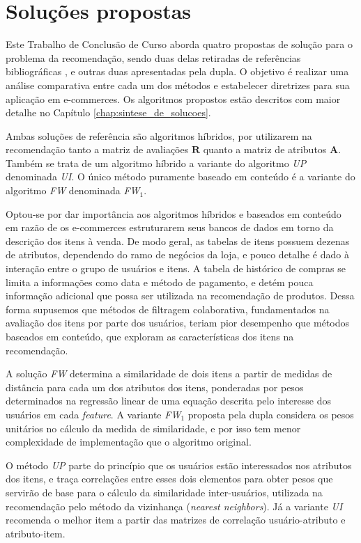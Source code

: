 
\section{Soluções propostas} %
\label{sec:solu_es_propostas}

Este Trabalho de Conclusão de Curso aborda quatro propostas de solução para o problema da recomendação, sendo duas delas retiradas de referências bibliográficas \cite{symeonidis2007feature,debnath2008feature}, e outras duas apresentadas pela dupla. O objetivo é realizar uma análise comparativa entre cada um dos métodos e estabelecer diretrizes para sua aplicação em e-commerces. Os algoritmos propostos estão descritos com maior detalhe no Capítulo \ref{chap:sintese_de_solucoes}.

Ambas soluções de referência são algoritmos híbridos, por utilizarem na recomendação tanto a matriz de avaliações $\mathbf{R}$ quanto a matriz de atributos $\mathbf{A}$. Também se trata de um algoritmo híbrido a variante do algoritmo \textit{UP} \cite{debnath2008feature} denominada \textit{UI}. O único método puramente baseado em conteúdo é a variante do algoritmo \textit{FW} \cite{symeonidis2007feature} denominada \textit{FW$_1$}. 

Optou-se por dar importância aos algoritmos híbridos e baseados em conteúdo em razão de os e-commerces estruturarem seus bancos de dados em torno da descrição dos itens à venda. De modo geral, as tabelas de itens possuem dezenas de atributos, dependendo do ramo de negócios da loja, e pouco detalhe é dado à interação entre o grupo de usuários e itens. A tabela de histórico de compras se limita a informações como data e método de pagamento, e detém pouca informação adicional que possa ser utilizada na recomendação de produtos. Dessa forma supusemos que métodos de filtragem colaborativa, fundamentados na avaliação dos itens por parte dos usuários, teriam pior desempenho que métodos baseados em conteúdo, que exploram as características dos itens na recomendação. 

A solução \textit{FW} determina a similaridade de dois itens a partir de medidas de distância para cada um dos atributos dos itens, ponderadas por pesos determinados na regressão linear de uma equação descrita pelo interesse dos usuários em cada \textit{feature}. A variante \textit{FW$_1$} proposta pela dupla considera os pesos unitários no cálculo da medida de similaridade, e por isso tem menor complexidade de implementação que o algoritmo original.

O método \textit{UP} parte do princípio que os usuários estão interessados nos atributos dos itens, e traça correlações entre esses dois elementos para obter pesos que servirão de base para o cálculo da similaridade inter-usuários, utilizada na recomendação pelo método da vizinhança (\textit{nearest neighbors}). Já a variante \textit{UI} recomenda o melhor item a partir das matrizes de correlação usuário-atributo e atributo-item.



